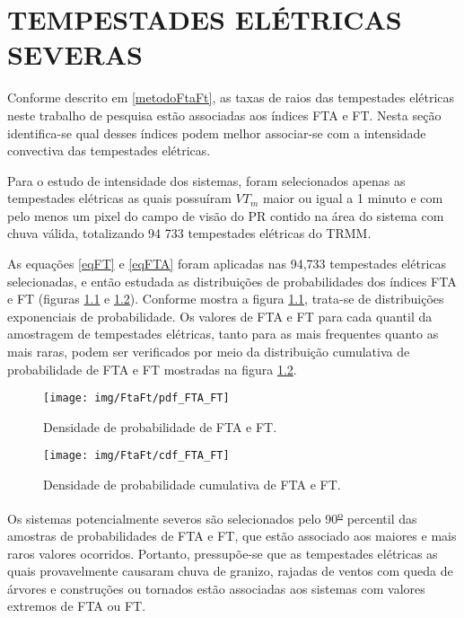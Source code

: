 \chapter{TEMPESTADES ELÉTRICAS SEVERAS}

Conforme descrito em \ref{metodoFtaFt}, as taxas de raios das tempestades elétricas neste trabalho de pesquisa estão associadas aos índices FTA e FT. Nesta seção identifica-se qual desses índices podem melhor associar-se com a intensidade convectiva das tempestades elétricas.

Para o estudo de intensidade dos sistemas, foram selecionados apenas as tempestades elétricas as quais possuíram $VT_m$ maior ou igual a 1 minuto e com pelo menos um pixel do campo de visão do PR contido na área do sistema com chuva válida, totalizando 94 733 tempestades elétricas do TRMM. %

As equações \ref{eqFT} e \ref{eqFTA} foram aplicadas nas 94,733 tempestades elétricas selecionadas, e então estudada as distribuições de probabilidades dos índices FTA e FT (figuras \ref{pdfFTAFT} e \ref{cdfFTAFT}). Conforme mostra a figura \ref{pdfFTAFT}, trata-se de distribuições exponenciais de probabilidade. Os valores de FTA e FT para cada quantil da amostragem de tempestades elétricas, tanto para as mais frequentes quanto as mais raras, podem ser verificados por meio da distribuição cumulativa de probabilidade de FTA e FT mostradas na figura \ref{cdfFTAFT}. 

\begin{figure}[!ht]
  \centering
  \texttt{[image: img/FtaFt/pdf\_FTA\_FT]}      
  \caption{Densidade de probabilidade de FTA e FT.} 
   \label{pdfFTAFT} 
\end{figure}

\begin{figure}[!hb]
  \centering 
  \texttt{[image: img/FtaFt/cdf\_FTA\_FT]} 
  \caption{Densidade de probabilidade cumulativa de FTA e FT.}
  \label{cdfFTAFT}
\end{figure}

Os sistemas potencialmente severos são selecionados pelo 90\textsuperscript{\underline{o}} percentil das amostras de probabilidades de FTA e FT, que estão associado aos maiores e mais raros valores ocorridos. Portanto, pressupõe-se que as tempestades elétricas as quais provavelmente causaram chuva de granizo, rajadas de ventos com queda de árvores e construções ou tornados estão associadas aos sistemas com valores extremos de FTA ou FT.

